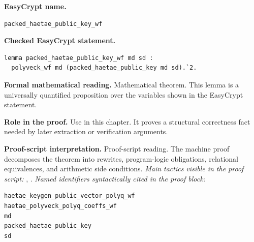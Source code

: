 \begin{formaltheorem}
\noindent\textbf{EasyCrypt name.}
\begin{lstlisting}[language=EasyCrypt,basicstyle=\ttfamily\scriptsize]
packed_haetae_public_key_wf
\end{lstlisting}
\noindent\textbf{Checked EasyCrypt statement.}
\begin{lstlisting}[language=EasyCrypt,basicstyle=\ttfamily\scriptsize]
lemma packed_haetae_public_key_wf md sd :
  polyveck_wf md (packed_haetae_public_key md sd).`2.
\end{lstlisting}
\noindent\textbf{Formal mathematical reading.}
Mathematical theorem. This lemma is a universally quantified proposition over the variables shown in the EasyCrypt statement.

\noindent\textbf{Role in the proof.}
Use in this chapter. It proves a structural correctness fact needed by later extraction or verification arguments.

\noindent\textbf{Proof-script interpretation.}
Proof-script reading. The machine proof decomposes the theorem into rewrites, program-logic obligations, relational equivalences, and arithmetic side conditions.
\emph{Main tactics visible in the proof script:} , .
\emph{Named identifiers syntactically cited in the proof block:}
\begin{lstlisting}[language=EasyCrypt,basicstyle=\ttfamily\scriptsize]
haetae_keygen_public_vector_polyq_wf
haetae_polyveck_polyq_coeffs_wf
md
packed_haetae_public_key
sd
\end{lstlisting}

\end{formaltheorem}

